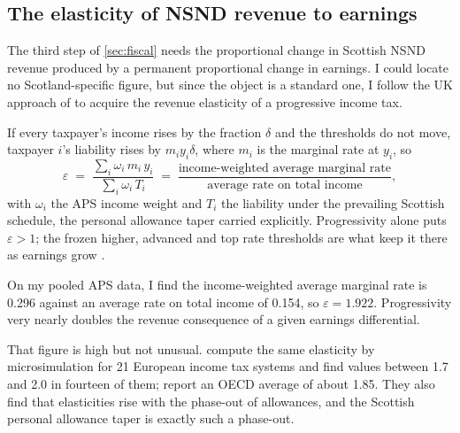 \subsection{The elasticity of NSND revenue to earnings}\label{app:elasticity}

The third step of \cref{sec:fiscal} needs the proportional change in Scottish NSND revenue produced by a permanent proportional change in earnings. I could locate no Scotland-specific figure, but since the object is a standard one, I follow the UK approach of \citet{creedy2004} to acquire the revenue elasticity of a progressive income tax. 

If every taxpayer's income rises by the fraction $\delta$ and the thresholds do not move, taxpayer $i$'s liability rises by $m_i y_i \delta$, where $m_i$ is the marginal rate at $y_i$, so
\begin{equation}\label{eq:elasticity}
\varepsilon \;=\;
\frac{\sum_i \omega_i\, m_i\, y_i}{\sum_i \omega_i\, T_i}
\;=\;
\frac{\text{income-weighted average marginal rate}}
     {\text{average rate on total income}},
\end{equation}
with $\omega_i$ the APS income weight and $T_i$ the liability under the prevailing Scottish schedule, the personal allowance taper carried explicitly. 
Progressivity alone puts $\varepsilon > 1$; the frozen higher, advanced and top rate thresholds are what keep it there as earnings grow \citep{sgreadyreckoner2026}.

On my pooled APS data, I find the income-weighted average marginal rate is 0.296 against an average rate on total income of 0.154, so $\varepsilon = 1.922$. Progressivity very nearly doubles the revenue consequence of a given earnings differential.

That figure is high but not unusual. \citet{garcia2026} compute the same elasticity by microsimulation for 21 European income tax systems and find values between 1.7 and 2.0 in fourteen of them; \citet{price2015} report an OECD average of about 1.85. They also find that elasticities rise with the phase-out of allowances, and the Scottish personal allowance taper is exactly such a phase-out. %

